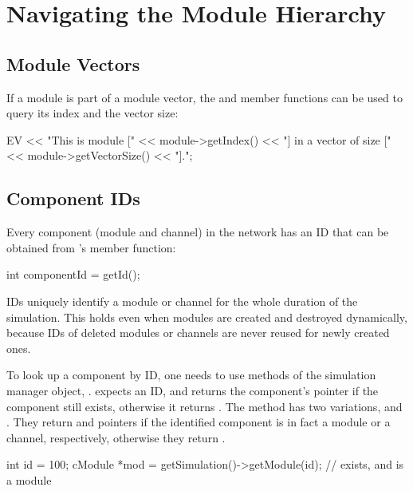 \section{Navigating the Module Hierarchy}
\label{sec:simple-modules:walking-module-hierarchy}

\subsection{Module Vectors}
\label{sec:simple-modules:module-vectors}

If a module is part of a module vector, the
 and  member functions can be used to
query its index and the vector size:

\begin{cpp}
EV << "This is module [" << module->getIndex() <<
      "] in a vector of size [" << module->getVectorSize() << "].\n";
\end{cpp}


\subsection{Component IDs}
\label{sec:simple-modules:module-ids}

Every component (module and channel) in the network has an ID that
can be obtained from 's  member
function:

\begin{cpp}
int componentId = getId();
\end{cpp}

IDs uniquely identify a module or channel for the whole duration of the
simulation. This holds even when modules are created and destroyed
dynamically, because IDs of deleted modules or channels are never reused for
newly created ones.

To look up a component by ID, one needs to use methods of the simulation
manager object, .  expects an ID, and
returns the component's pointer if the component still exists, otherwise it
returns . The method has two variations, 
and . They return  and 
pointers if the identified component is in fact a module or a channel, respectively,
otherwise they return .

\begin{cpp}
int id = 100;
cModule *mod = getSimulation()->getModule(id); // exists, and is a module
\end{cpp}


